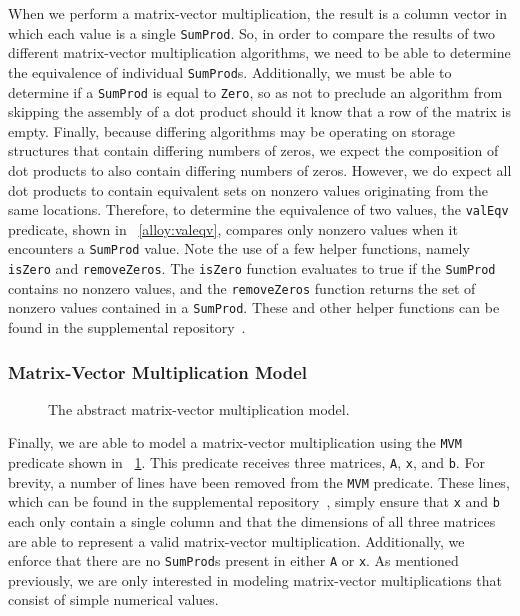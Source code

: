 \documentclass[sigconf]{acmart}
\begin{document}
When we perform a matrix-vector multiplication, the result is a column vector in which each value is a single \texttt{SumProd}.  So, in order to compare the results of two different matrix-vector multiplication algorithms, we need to be able to determine the equivalence of individual \texttt{SumProd}s.  Additionally, we must be able to determine if a \texttt{SumProd} is equal to \texttt{Zero}, so as not to preclude an algorithm from skipping the assembly of a dot product should it know that a row of the matrix is empty.  Finally, because differing algorithms may be operating on storage structures that contain differing numbers of zeros, we expect the composition of dot products to also contain differing numbers of zeros.  However, we do expect all dot products to contain equivalent sets on nonzero values originating from the same locations.  Therefore, to determine the equivalence of two values, the \texttt{valEqv} predicate, shown in \figurename~\ref{alloy:valeqv}, compares only nonzero values when it encounters a \texttt{SumProd} value.  Note the use of a few helper functions, namely \texttt{isZero} and \texttt{removeZeros}.  The \texttt{isZero} function evaluates to true if the \texttt{SumProd} contains no nonzero values, and the \texttt{removeZeros} function returns the set of nonzero values contained in a \texttt{SumProd}.  These and other helper functions can be found in the supplemental repository~\cite{repository}.

\subsubsection{Matrix-Vector Multiplication Model}
\label{sec:abstractmvm}

\begin{figure}

\caption{The abstract matrix-vector multiplication model.}
\label{alloy:mvmabs}
\end{figure}

Finally, we are able to model a matrix-vector multiplication using the \texttt{MVM} predicate shown in \figurename~\ref{alloy:mvmabs}.  This predicate receives three matrices, \texttt{A}, \texttt{x}, and \texttt{b}.
For brevity, a number of lines have been removed from the \texttt{MVM} predicate.  These lines, which can be found in the supplemental repository~\cite{repository}, simply ensure that \texttt{x} and \texttt{b} each only contain a single column and that the dimensions of all three matrices are able to represent a valid matrix-vector multiplication.
Additionally, we enforce that there are no \texttt{SumProd}s present in either \texttt{A} or \texttt{x}.  As mentioned previously, we are only interested in modeling matrix-vector multiplications that consist of simple numerical values.
\end{document}

